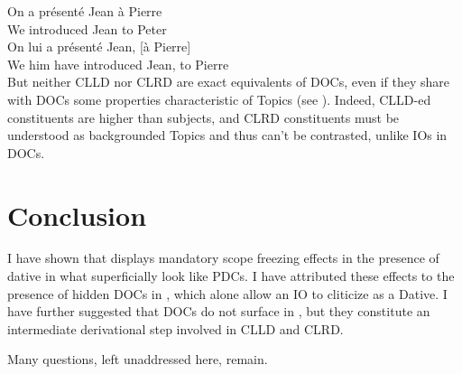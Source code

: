\documentclass[output=paper]{langsci/langscibook}
\begin{document}
\ea \label{clrd}
\ea
	\gll  On              a   pr\'{e}sent\'{e}     Jean \`a Pierre \\
    We  {} introduced Jean to Peter\\
\ex
	\gll  On      lui        a   pr\'{e}sent\'{e}    Jean,  [\`a Pierre] \\
         We  him\tss{\Dat} have introduced     Jean, to Pierre \\
\z
\z
%
But neither CLLD nor \gls{CLRD} are exact
equivalents of \glspl{DOC}, even if they share with \glspl{DOC} some properties
characteristic of Topics (see \citealt{Polinsky:1996}). Indeed, \gls{CLLD}-ed
constituents are higher than subjects, and \gls{CLRD} constituents must be understood as backgrounded Topics and thus
can't be contrasted, unlike \glspl{IO} in \glspl{DOC}.

\section{Conclusion}

I have shown that  displays mandatory scope freezing effects in the
presence of dative  in what superficially look like \glspl{PDC}. I have
attributed these effects to the presence of hidden \glspl{DOC} in , which
alone allow an IO to cliticize as a Dative. I have further suggested that
\glspl{DOC} do not surface in , but they constitute an intermediate
derivational step  involved in \gls{CLLD} and
\gls{CLRD}.

Many questions, left unaddressed here, remain.
\end{document}
